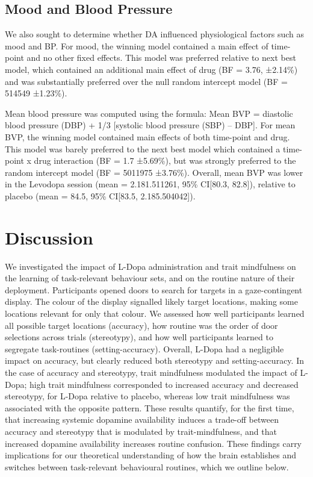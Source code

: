 \documentclass{article}
\begin{document}
\hypertarget{mood-and-blood-pressure}{%
\subsection{Mood and Blood Pressure}\label{mood-and-blood-pressure}}

We also sought to determine whether DA influenced physiological factors
such as mood and BP. For mood, the winning model contained a main effect
of time-point and no other fixed effects. This model was preferred
relative to next best model, which contained an additional main effect
of drug (BF = 3.76, ±2.14\%) and was substantially preferred over the
null random intercept model (BF = 514549 ±1.23\%).

Mean blood pressure was computed using the formula: Mean BVP = diastolic
blood pressure (DBP) + 1/3 {[}systolic blood pressure (SBP) -- DBP{]}.
For mean BVP, the winning model contained main effects of both
time-point and drug. This model was barely preferred to the next best
model which contained a time-point x drug interaction (BF = 1.7
±5.69\%), but was strongly preferred to the random intercept model (BF =
5011975 ±3.76\%). Overall, mean BVP was lower in the Levodopa session
(mean = 2.181.511261, 95\% CI{[}80.3, 82.8{]}), relative to placebo
(mean = 84.5, 95\% CI{[}83.5, 2.185.504042{]}).

\hypertarget{discussion}{%
\section{Discussion}\label{discussion}}

We investigated the impact of L-Dopa administration and trait
mindfulness on the learning of task-relevant behaviour sets, and on the
routine nature of their deployment. Participants opened doors to search
for targets in a gaze-contingent display. The colour of the display
signalled likely target locations, making some locations relevant for
only that colour. We assessed how well participants learned all possible
target locations (accuracy), how routine was the order of door
selections across trials (stereotypy), and how well participants learned
to segregate task-routines (setting-accuracy). Overall, L-Dopa had a
negligible impact on accuracy, but clearly reduced both stereotypy and
setting-accuracy. In the case of accuracy and stereotypy, trait
mindfulness modulated the impact of L-Dopa; high trait mindfulness
corresponded to increased accuracy and decreased stereotypy, for L-Dopa
relative to placebo, whereas low trait mindfulness was associated with
the opposite pattern. These results quantify, for the first time, that
increasing systemic dopamine availability induces a trade-off between
accuracy and stereotypy that is modulated by trait-mindfulness, and that
increased dopamine availability increases routine confusion. These
findings carry implications for our theoretical understanding of how the
brain establishes and switches between task-relevant behavioural
routines, which we outline below.
\end{document}
